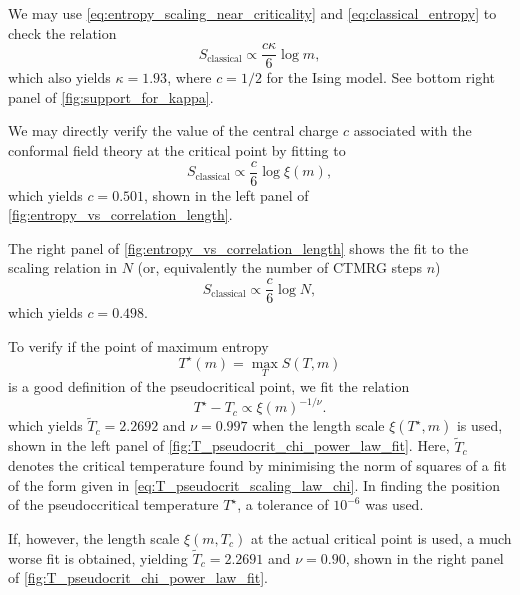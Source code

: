 We may use \autoref{eq:entropy_scaling_near_criticality} and \autoref{eq:classical_entropy} to check the
relation
\begin{equation}\label{eq:scaling_law_entropy_kappa}
  S_{\text{classical}} \propto \frac{c\kappa}{6}\log m,
\end{equation}
which also yields $\kappa = 1.93$, where $c = 1/2$ for the Ising model. See bottom right panel of
\autoref{fig:support_for_kappa}.

We may directly verify the value of the central charge $c$ associated with the conformal field theory at the critical
point by fitting to
\begin{equation}\label{eq:entropy_vs_correlation_length}
  S_{\text{classical}} \propto \frac{c}{6} \log \xi(m),
\end{equation}
which yields $c = 0.501$, shown in the left panel of \autoref{fig:entropy_vs_correlation_length}.

The right panel of \autoref{fig:entropy_vs_correlation_length} shows the fit to the scaling relation in $N$ (or,
equivalently the number of CTMRG steps $n$)
\begin{equation}\label{eq:entropy_vs_N}
  S_{\text{classical}} \propto \frac{c}{6} \log N,
\end{equation}
which yields $c = 0.498$.

To verify if the point of maximum entropy
\begin{equation}
  T^{\star}(m) = \max_{T} S(T, m)
\end{equation}
is a good definition of the pseudocritical point, we fit the relation
\begin{equation}\label{eq:T_pseudocrit_scaling_law_chi}
  T^{\star} - T_c \propto \xi(m)^{-1 / \nu}.
\end{equation}
which yields $\widetilde{T}_c = 2.2692$ and $\nu = 0.997$ when the length scale $\xi(T^{\star}, m)$ is used, shown in
the left panel of \autoref{fig:T_pseudocrit_chi_power_law_fit}. Here, $\widetilde{T}_c$ denotes the critical temperature
found by minimising the norm of squares of a fit of the form given in \autoref{eq:T_pseudocrit_scaling_law_chi}. In
finding the position of the pseudoccritical temperature $T^{\star}$, a tolerance of $10^{-6}$ was used.

If, however, the length scale $\xi(m, T_c)$ at the actual critical point is used, a much worse fit is obtained, yielding
$\widetilde{T}_c = 2.2691$ and $\nu = 0.90$, shown in the right panel of
\autoref{fig:T_pseudocrit_chi_power_law_fit}.

